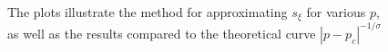 \documentclass[12pt]{article}
\begin{document}
\begin{figure}[ht]
\centering
{}
\caption[Optional caption for list of figures]{The plots illustrate the method for approximating $s_\xi$ for various $p$, as well as the results compared to the theoretical curve $|p-p_c|^{-1/\sigma}$}
\label{fig:sigma}
\end{figure}
\end{document}
